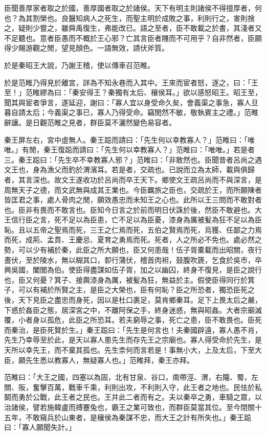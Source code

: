 \begin{pinyinscope}
臣聞善厚家者取之於國，善厚國者取之於諸侯。天下有明主則諸侯不得擅厚者，何也？為其割榮也。良醫知病人之死生，而聖主明於成敗之事，利則行之，害則捨之，疑則少嘗之，雖舜禹復生，弗能改已。語之至者，臣不敢載之於書，其淺者又不足聽也。意者臣愚而不概於王心邪？亡其言臣者賤而不可用乎？自非然者，臣願得少賜游觀之閒，望見顏色。一語無效，請伏斧質。

於是秦昭王大說，乃謝王稽，使以傳車召范睢。

於是范睢乃得見於離宮，詳為不知永巷而入其中。王來而宦者怒，逐之，曰：「王至！」范睢繆為曰：「秦安得王？秦獨有太后、穰侯耳。」欲以感怒昭王。昭王至，聞其與宦者爭言，遂延迎，謝曰：「寡人宜以身受命久矣，會義渠之事急，寡人旦暮自請太后；今義渠之事已，寡人乃得受命。竊閔然不敏，敬執賓主之禮。」范睢辭讓。是日觀范睢之見者，群臣莫不灑然變色易容者。

秦王屏左右，宮中虛無人。秦王跽而請曰：「先生何以幸教寡人？」范睢曰：「唯唯。」有閒，秦王復跽而請曰：「先生何以幸教寡人？」范睢曰：「唯唯。」若是者三。秦王跽曰：「先生卒不幸教寡人邪？」范睢曰：「非敢然也。臣聞昔者呂尚之遇文王也，身為漁父而釣於渭濱耳。若是者，交疏也。已說而立為太師，載與俱歸者，其言深也。故文王遂收功於呂尚而卒王天下。鄉使文王疏呂尚而不與深言，是周無天子之德，而文武無與成其王業也。今臣羈旅之臣也，交疏於王，而所願陳者皆匡君之事，處人骨肉之閒，願效愚忠而未知王之心也。此所以王三問而不敢對者也。臣非有畏而不敢言也。臣知今日言之於前而明日伏誅於後，然臣不敢避也。大王信行臣之言，死不足以為臣患，亡不足以為臣憂，漆身為厲被髪為狂不足以為臣恥。且以五帝之聖焉而死，三王之仁焉而死，五伯之賢焉而死，烏獲、任鄙之力焉而死，成荊、孟賁、王慶忌、夏育之勇焉而死。死者，人之所必不免也。處必然之勢，可以少有補於秦，此臣之所大願也，臣又何患哉！伍子胥橐載而出昭關，夜行晝伏，至於陵水，無以糊其口，厀行蒲伏，稽首肉袒，鼓腹吹篪，乞食於吳市，卒興吳國，闔閭為伯。使臣得盡謀如伍子胥，加之以幽囚，終身不復見，是臣之說行也，臣又何憂？箕子、接輿漆身為厲，被髪為狂，無益於主。假使臣得同行於箕子，可以有補於所賢之主，是臣之大榮也，臣有何恥？臣之所恐者，獨恐臣死之後，天下見臣之盡忠而身死，因以是杜口裹足，莫肯鄉秦耳。足下上畏太后之嚴，下惑於姦臣之態，居深宮之中，不離阿保之手，終身迷惑，無與昭姦。大者宗廟滅覆，小者身以孤危，此臣之所恐耳。若夫窮辱之事，死亡之患，臣不敢畏也。臣死而秦治，是臣死賢於生。」秦王跽曰：「先生是何言也！夫秦國辟遠，寡人愚不肖，先生乃幸辱至於此，是天以寡人慁先生而存先王之宗廟也。寡人得受命於先生，是天所以幸先王，而不棄其孤也。先生柰何而言若是！事無小大，上及太后，下至大臣，願先生悉以教寡人，無疑寡人也。」范睢拜，秦王亦拜。

范睢曰：「大王之國，四塞以為固，北有甘泉、谷口，南帶涇、渭，右隴、蜀，左關、阪，奮擊百萬，戰車千乘，利則出攻，不利則入守，此王者之地也。民怯於私鬬而勇於公戰，此王者之民也。王并此二者而有之。夫以秦卒之勇，車騎之眾，以治諸侯，譬若施韓盧而搏蹇兔也，霸王之業可致也，而群臣莫當其位。至今閉關十五年，不敢窺兵於山東者，是穰侯為秦謀不忠，而大王之計有所失也。」秦王跽曰：「寡人願聞失計。」


\end{pinyinscope}
